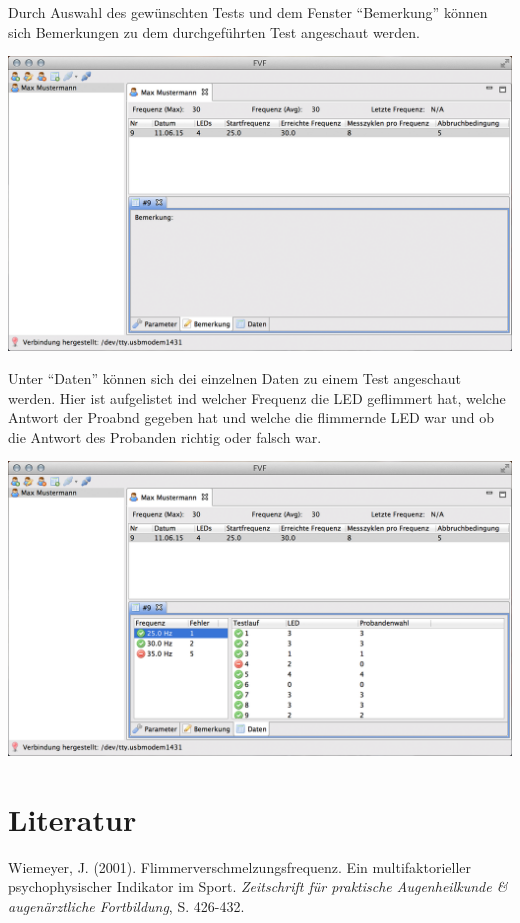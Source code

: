 \documentclass[11pt,accentcolor=tud2a,colorback,noheadingspace]{tudreport}
\begin{document}
Durch Auswahl des gewünschten Tests und dem Fenster ``Bemerkung'' können sich Bemerkungen zu dem durchgeführten Test angeschaut werden.

\includegraphics[width=\textwidth]{results_notes.png}

Unter ``Daten'' können sich dei einzelnen Daten zu einem Test angeschaut werden. Hier ist aufgelistet ind welcher Frequenz die LED geflimmert hat, welche Antwort der Proabnd gegeben hat und welche die flimmernde LED war und ob die Antwort des Probanden richtig oder falsch war.

\includegraphics[width=\textwidth]{results_runs.png}


\chapter{Literatur}
\label{references::doc}\label{references:literatur}
Wiemeyer, J. (2001). Flimmerverschmelzungsfrequenz. Ein multifaktorieller psychophysischer Indikator im Sport. \emph{Zeitschrift für praktische Augenheilkunde \& augenärztliche Fortbildung}, S. 426-432.
\end{document}
